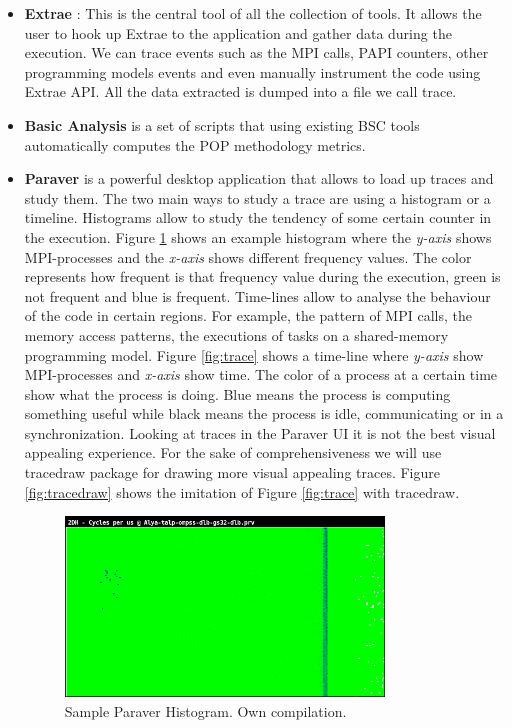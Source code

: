 \begin{itemize}
  \item \textbf{Extrae} \cite{extraeTools}: This is the central tool of all the collection of tools. It allows the user to hook up Extrae to the application and gather data during the execution. We can trace events such as the MPI calls, PAPI \cite{papi}  counters, other programming models events and even manually instrument the code using Extrae API. All the data extracted is dumped into a file we call trace.
  \item \textbf{Basic Analysis} is a set of scripts that using existing BSC tools automatically computes the POP methodology metrics.
  \item \textbf{Paraver} \cite{paraverPaper} \cite{paraverWeb} is a powerful desktop application that allows to load up traces and study them. The two main ways to study a trace are using a histogram or a timeline. Histograms allow to study the tendency of some certain counter in the execution. Figure \ref{fig:hist} shows an example histogram where the \textit{y-axis} shows MPI-processes and the \textit{x-axis} shows different frequency values. The color represents how frequent is that frequency value during the execution, green is not frequent and blue is frequent. Time-lines allow to analyse the behaviour of the code in certain regions. For example, the pattern of MPI calls, the memory access patterns, the executions of tasks on a shared-memory programming model. Figure \ref{fig:trace} shows a time-line where \textit{y-axis} show MPI-processes and \textit{x-axis} show time. The color of a process at a certain time show what the process is doing. Blue means the process is computing something useful while black means the process is idle, communicating or in a synchronization. Looking at traces in the Paraver UI it is not the best visual appealing experience. For the sake of comprehensiveness we will use tracedraw \cite{tracedraw} package for drawing more visual appealing traces. Figure \ref{fig:tracedraw} shows the imitation of Figure \ref{fig:trace} with tracedraw.

    \begin{figure}[htbp]
      \centering
      \includegraphics[width=0.8\textwidth]{sample_histogram}
      \caption[Sample Paraver Histogram]{Sample Paraver Histogram. Own compilation.}
      \label{fig:hist}
    \end{figure}


\end{itemize}
